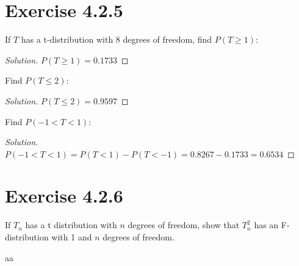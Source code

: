 \documentclass[titlepage, letterpaper, fleqn]{article}
\newcommand{\spacepls}{\vspace{5mm}}
\renewcommand\qedsymbol{\(\blacksquare\)}
\newenvironment{solution}
{\renewcommand\qedsymbol{$\square$}\begin{proof}[Solution]}
{\end{proof}}
\begin{document}
\spacepls

\section{Exercise 4.2.5}

{\large If $T$ has a t-distribution with 8 degrees of freedom, find $P(T \geq 1)$:}

\begin{solution}
$P(T \geq 1) = 0.1733 $
\end{solution}

\spacepls

{\large Find $P(T \leq 2)$:}

\begin{solution}
$P(T \leq 2) = 0.9597$
\end{solution}

\spacepls

{\large Find $P(-1 < T < 1)$:}

\begin{solution}
$P(-1 < T < 1) = P(T < 1) - P(T < -1) = 0.8267 - 0.1733 = 0.6534$
\end{solution}

\spacepls

\section{Exercise 4.2.6}

{\large If $T_n$ has a t distribution with $n$ degrees of freedom, show that $T_n^2$ has an F-distribution with 1 and $n$ degrees of freedom.}

aa
\end{document}

